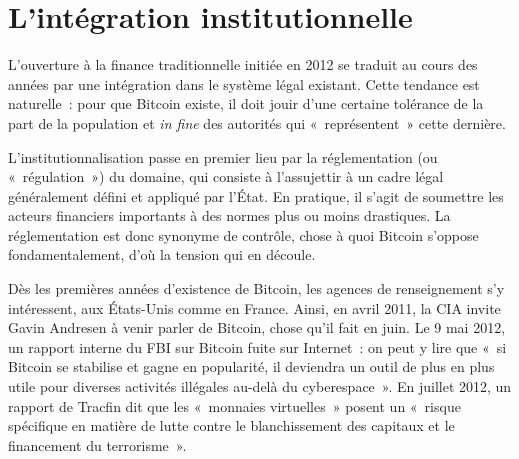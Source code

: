 \section*{L'intégration institutionnelle} %

L'ouverture à la finance traditionnelle initiée en 2012 se traduit au cours des années par une intégration dans le système légal existant. Cette tendance est naturelle~: pour que Bitcoin existe, il doit jouir d'une certaine tolérance de la part de la population et \emph{in fine} des autorités qui «~représentent~» cette dernière.

L'institutionnalisation passe en premier lieu par la réglementation (ou «~régulation~») du domaine, qui consiste à l'assujettir à un cadre légal généralement défini et appliqué par l'État. En pratique, il s'agit de soumettre les acteurs financiers importants à des normes plus ou moins drastiques. La réglementation est donc synonyme de contrôle, chose à quoi Bitcoin s'oppose fondamentalement, d'où la tension qui en découle.


Dès les premières années d'existence de Bitcoin, les agences de renseignement s'y intéressent, aux États-Unis comme en France. Ainsi, en avril 2011, la CIA invite Gavin Andresen à venir parler de Bitcoin, chose qu'il fait en juin. Le 9 mai 2012, un rapport interne du FBI sur Bitcoin fuite sur Internet~: on peut y lire que «~si Bitcoin se stabilise et gagne en popularité, il deviendra un outil de plus en plus utile pour diverses activités illégales au-delà du cyberespace~». En juillet 2012, un rapport de Tracfin dit que les «~monnaies virtuelles~» posent un «~risque spécifique en matière de lutte contre le blanchissement des capitaux et le financement du terrorisme~».

